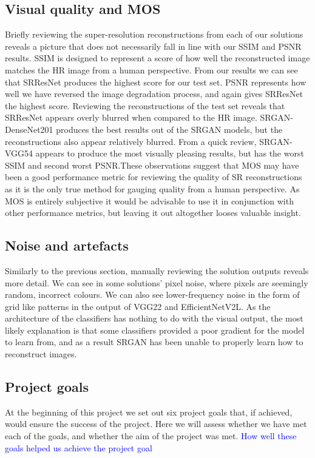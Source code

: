 \subsection{Visual quality and MOS}
Briefly reviewing the super-resolution reconstructions from each of our solutions reveals a picture that does not necessarily fall in line with our SSIM and PSNR results. SSIM is designed to represent a score of how well the reconstructed image matches the HR image from a human perspective. From our results we can see that SRResNet produces the highest score for our test set. PSNR represents how well we have reversed the image degradation process, and again gives SRResNet the highest score. Reviewing the reconstructions of the test set reveals that SRResNet appears overly blurred when compared to the HR image. SRGAN-DenseNet201 produces the best results out of the SRGAN models, but the reconstructions also appear relatively blurred. From a quick review, SRGAN-VGG54 appears to produce the most visually pleasing results, but has the worst SSIM and second worst PSNR.\@ These observations suggest that MOS may have been a good performance metric for reviewing the quality of SR reconstructions as it is the only true method for gauging quality from a human perspective. As MOS is entirely subjective it would be advisable to use it in conjunction with other performance metrics, but leaving it out altogether looses valuable insight.

\subsection{Noise and artefacts}
Similarly to the previous section, manually reviewing the solution outputs reveals more detail. We can see in some solutions' pixel noise, where pixels are seemingly random, incorrect colours. We can also see lower-frequency noise in the form of grid like patterns in the output of VGG22 and EfficientNetV2L. As the architecture of the classifiers has nothing to do with the visual output, the most likely explanation is that some classifiers provided a poor gradient for the model to learn from, and as a result SRGAN has been unable to properly learn how to reconstruct images.

\subsection{Project goals}
At the beginning of this project we set out six project goals that, if achieved, would ensure the success of the project. Here we will assess whether we have met each of the goals, and whether the aim of the project was met. \textcolor{blue}{How well these goals helped us achieve the project goal}

